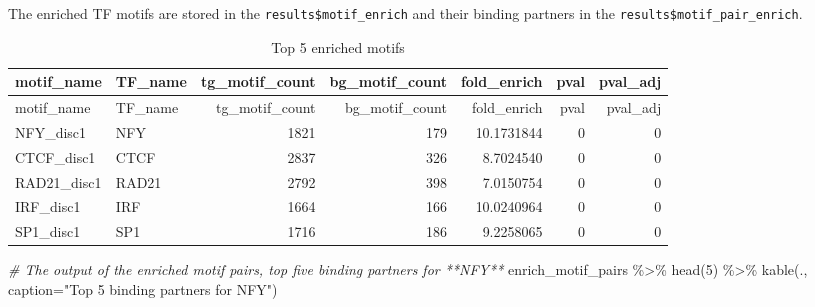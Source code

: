 \documentclass[
]{article}
\newenvironment{Shaded}{}{}
\newcommand{\AttributeTok}[1]{\textcolor[rgb]{0.49,0.56,0.16}{#1}}
\newcommand{\CommentTok}[1]{\textcolor[rgb]{0.38,0.63,0.69}{\textit{#1}}}
\newcommand{\DecValTok}[1]{\textcolor[rgb]{0.25,0.63,0.44}{#1}}
\newcommand{\FunctionTok}[1]{\textcolor[rgb]{0.02,0.16,0.49}{#1}}
\newcommand{\NormalTok}[1]{#1}
\newcommand{\OtherTok}[1]{\textcolor[rgb]{0.00,0.44,0.13}{#1}}
\newcommand{\SpecialCharTok}[1]{\textcolor[rgb]{0.25,0.44,0.63}{#1}}
\newcommand{\StringTok}[1]{\textcolor[rgb]{0.25,0.44,0.63}{#1}}
\begin{document}
The enriched TF motifs are stored in the \texttt{results\$motif\_enrich}
and their binding partners in the \texttt{results\$motif\_pair\_enrich}.

\begin{Shaded}
\end{Shaded}

\begin{longtable}[]{@{}llrrrrr@{}}
\caption{Top 5 enriched motifs}\tabularnewline
\toprule
motif\_name & TF\_name & tg\_motif\_count & bg\_motif\_count &
fold\_enrich & pval & pval\_adj \\
\midrule
\endfirsthead
\toprule
motif\_name & TF\_name & tg\_motif\_count & bg\_motif\_count &
fold\_enrich & pval & pval\_adj \\
\midrule
\endhead
NFY\_disc1 & NFY & 1821 & 179 & 10.1731844 & 0 & 0 \\
CTCF\_disc1 & CTCF & 2837 & 326 & 8.7024540 & 0 & 0 \\
RAD21\_disc1 & RAD21 & 2792 & 398 & 7.0150754 & 0 & 0 \\
IRF\_disc1 & IRF & 1664 & 166 & 10.0240964 & 0 & 0 \\
SP1\_disc1 & SP1 & 1716 & 186 & 9.2258065 & 0 & 0 \\
\bottomrule
\end{longtable}

\begin{Shaded}
\begin{Highlighting}[]
\CommentTok{\# The output of the enriched motif pairs, top five binding partners for **NFY** }
\NormalTok{enrich\_motif\_pairs }\SpecialCharTok{\%\textgreater{}\%} \FunctionTok{head}\NormalTok{(}\DecValTok{5}\NormalTok{) }\SpecialCharTok{\%\textgreater{}\%} 
    \FunctionTok{kable}\NormalTok{(., }\AttributeTok{caption=}\StringTok{"Top 5 binding partners for NFY"}\NormalTok{)}
\end{Highlighting}
\end{Shaded}
\end{document}
